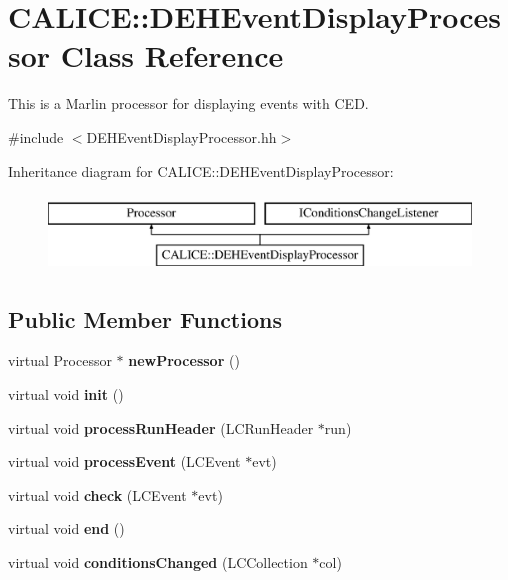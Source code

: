 \section{C\-A\-L\-I\-C\-E\-:\-:D\-E\-H\-Event\-Display\-Processor Class Reference}
\label{classCALICE_1_1DEHEventDisplayProcessor}


This is a Marlin processor for displaying events with C\-E\-D.  




{\ttfamily \#include $<$D\-E\-H\-Event\-Display\-Processor.\-hh$>$}

Inheritance diagram for C\-A\-L\-I\-C\-E\-:\-:D\-E\-H\-Event\-Display\-Processor\-:\begin{figure}[H]
\begin{center}
\leavevmode
\includegraphics[height=2.000000cm]{classCALICE_1_1DEHEventDisplayProcessor}
\end{center}
\end{figure}
\subsection*{Public Member Functions}
\begin{DoxyCompactItemize}
\item 
virtual Processor $\ast$ {\bfseries new\-Processor} ()\label{classCALICE_1_1DEHEventDisplayProcessor_a7bcbd39aa9d9ea57a7c1175969cca469}

\item 
virtual void {\bf init} ()
\item 
virtual void {\bf process\-Run\-Header} (L\-C\-Run\-Header $\ast$run)
\item 
virtual void {\bf process\-Event} (L\-C\-Event $\ast$evt)
\item 
virtual void {\bfseries check} (L\-C\-Event $\ast$evt)\label{classCALICE_1_1DEHEventDisplayProcessor_ae42ba19ef5fa0c4c62bde36f8a40210e}

\item 
virtual void {\bf end} ()
\item 
virtual void {\bfseries conditions\-Changed} (L\-C\-Collection $\ast$col)\label{classCALICE_1_1DEHEventDisplayProcessor_a8230ef1e48e8ef2c3dae20ed3d009f70}

\end{DoxyCompactItemize}
